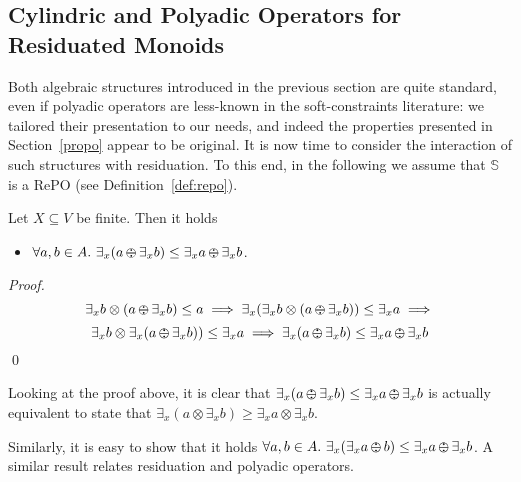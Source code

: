 \documentclass{llncs}
\def\monop{\otimes}
\def\odiv{\, {\ominus\hspace{-7.7pt} \div} \,}
\begin{document}

\subsection{Cylindric and Polyadic Operators for Residuated Monoids}
\label{cyre}
Both algebraic structures introduced in the previous section are quite standard,
even if polyadic operators are less-known in the soft-constraints literature:
we tailored their presentation to our needs, and indeed the properties
presented in Section~\ref{propo} appear to be original. It is now time to consider 
the interaction of such structures with residuation. 
%
To this end, in the following we assume that 
$\mathbb{S}$ is a RePO (see Definition~\ref{def:repo}).


\begin{lemma}
Let $X \subseteq V$ be finite. Then it holds
	\begin{itemize}
         \item $\forall a, b \in A.\ \exists_x(a \odiv \exists_x b) \leq \exists_x a \odiv \exists_x b$.
	\end{itemize}
\end{lemma}

\begin{proof}
 \[\exists_x b \otimes (a \odiv \exists_x b) \leq a \implies
   \exists_x(\exists_x b \otimes (a \odiv \exists_x b)) \leq \exists_x a \implies\]
 \[\exists_x b \otimes \exists_x(a \odiv \exists_x b)) \leq \exists_x a \implies
   \exists_x(a \odiv \exists_x b) \leq \exists_x a \odiv \exists_x b\]
   \qed
\end{proof}

\begin{remark}
Looking at the proof above, it is clear that $\exists_x(a \odiv \exists_x b) \leq \exists_x a \odiv \exists_x b$
is actually equivalent to state that
$\exists_x(a \monop \exists_x b) \geq \exists_x a \monop \exists_x b$.
\end{remark}


Similarly, it is easy to show that it holds $\forall a, b \in A.\ \exists_x(\exists_x a \odiv b) \leq \exists_x a \odiv \exists_x b$. 
%
A similar result relates residuation and polyadic operators.
\end{document}
